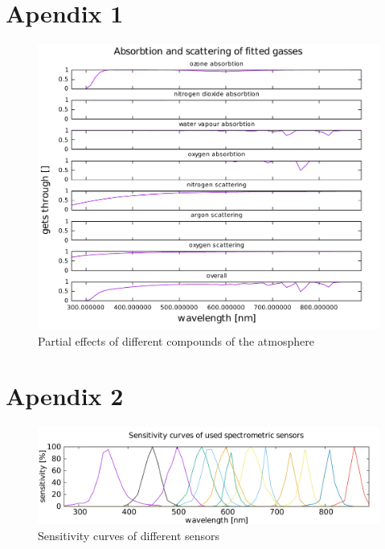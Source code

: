 \documentclass{cfp}
\begin{document}
\section{Apendix 1}
\begin{figure}[!h]
\caption{Partial effects of different compounds of the atmosphere}
\includegraphics[width=500pt]{spectroabs.pdf}
\end{figure}
\newpage
\pagebreak
\clearpage
\section{Apendix 2}
\begin{figure}[!h]
\caption{Sensitivity curves of different sensors}
\includegraphics[width=500pt]{spectrosen.pdf}
\end{figure}
\end{document}
